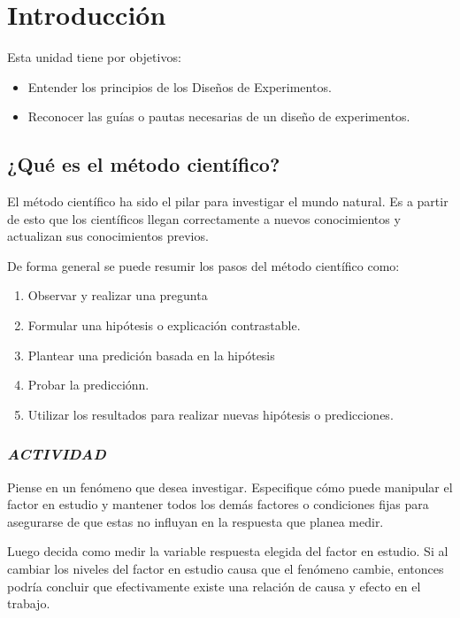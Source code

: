 \documentclass[]{book}
\providecommand{\tightlist}{%
  \setlength{\itemsep}{0pt}\setlength{\parskip}{0pt}}
\begin{document}
\chapter{Introducción}\label{intro}

Esta unidad tiene por objetivos:

\begin{itemize}
\tightlist
\item
  Entender los principios de los Diseños de Experimentos.
\item
  Reconocer las guías o pautas necesarias de un diseño de experimentos.
\end{itemize}

\section{¿Qué es el método
científico?}\label{que-es-el-metodo-cientifico}

El método científico ha sido el pilar para investigar el mundo natural.
Es a partir de esto que los científicos llegan correctamente a nuevos
conocimientos y actualizan sus conocimientos previos.

De forma general se puede resumir los pasos del método científico como:

\begin{enumerate}
\def\labelenumi{\arabic{enumi}.}
\tightlist
\item
  Observar y realizar una pregunta
\item
  Formular una hipótesis o explicación contrastable.
\item
  Plantear una predición basada en la hipótesis
\item
  Probar la predicciónn.
\item
  Utilizar los resultados para realizar nuevas hipótesis o predicciones.
\end{enumerate}

\subsection*{\texorpdfstring{\emph{ACTIVIDAD}}{ACTIVIDAD}}\label{actividad}

Piense en un fenómeno que desea investigar. Especifique cómo puede
manipular el factor en estudio y mantener todos los demás factores o
condiciones fijas para asegurarse de que estas no influyan en la
respuesta que planea medir.

Luego decida como medir la variable respuesta elegida del factor en
estudio. Si al cambiar los niveles del factor en estudio causa que el
fenómeno cambie, entonces podría concluir que efectivamente existe una
relación de causa y efecto en el trabajo.
\end{document}
